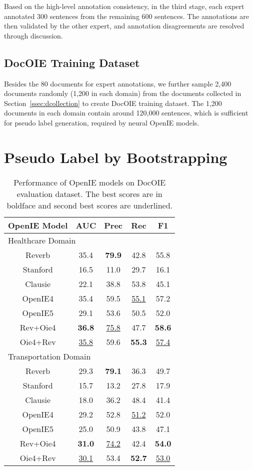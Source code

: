 \documentclass[11pt,a4paper]{article}
\newcommand{\dname}{DocOIE\xspace}
\begin{document}
Based on the high-level annotation consistency, in the third stage, each expert annotated 300 sentences from the remaining 600 sentences. The annotations are then validated by the other expert, and annotation disagreements are resolved through discussion.




\subsection{\dname Training Dataset}


Besides the 80 documents for expert annotations, we further sample 2,400 documents randomly (1,200 in each domain) from the documents collected in Section~\ref{ssec:dcollection} to create \dname training dataset.  The 1,200 documents in each domain contain around 120,000 sentences, which is sufficient for pseudo label generation, required by neural OpenIE models.


\section{Pseudo Label by Bootstrapping}




\begin{table}[!t]
\centering
\begin{tabular}{ c|cccc}
 \toprule
 OpenIE Model & AUC & Prec & Rec & F1\\
 \midrule
  \multicolumn{5}{l}{Healthcare Domain} \\
 \midrule
 Reverb &35.4 & \textbf{79.9}&42.8 & 55.8\\
 Stanford & 16.5 & 11.0 & 29.7 & 16.1\\
 Clausie &22.1 & 38.8 &53.8 & 45.1\\
 OpenIE4 &35.4 & 59.5 &\underline{55.1} & 57.2\\
 OpenIE5 &29.1 & 53.6 &50.5 & 52.0\\
 Rev+Oie4 &\textbf{36.8} & \underline{75.8} &47.7 &\textbf{58.6}\\
 Oie4+Rev &\underline{35.8} & 59.6 &\textbf{55.3} & \underline{57.4}\\
 \toprule
 \multicolumn{5}{l}{Transportation Domain} \\
\midrule
 Reverb &29.3 & \textbf{79.1}&36.3 & 49.7\\
 Stanford &15.7 & 13.2 &27.8 & 17.9 \\
 Clausie &18.0 & 36.2 &48.4 & 41.4\\
 OpenIE4 &29.2 & 52.8 &\underline{51.2} & 52.0\\
 OpenIE5 &25.0 & 50.9 &43.8 & 47.1\\
 Rev+Oie4 &\textbf{31.0} & \underline{74.2} &42.4 &\textbf{54.0}\\
 Oie4+Rev &\underline{30.1} & 53.4 &\textbf{52.7} & \underline{53.0}\\
 \bottomrule
\end{tabular}
\vspace{-0.5em}
\caption{Performance of OpenIE models on \dname evaluation dataset. The best scores are in boldface and second best scores are underlined.}
\label{tab:openie_systems}
\end{table}
\end{document}
